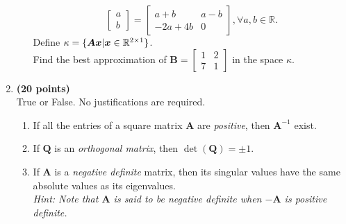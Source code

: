 \begin{enumerate}
\begin{enumerate}
\[\begin{bmatrix}
a\\b
\end{bmatrix}=\begin{bmatrix}
a+b&a-b\\-2a+4b&0
\end{bmatrix},\forall a,b\in\mathbb{R}.
\]
Define $\kappa=\{\bm{Ax}|\bm x\in\mathbb{R}^{2\times 1}\}$.\\
Find the best approximation of $\bm B=\begin{bmatrix}
1&2\\7&1
\end{bmatrix}$ in the space $\kappa$.\\
\end{enumerate}
\newpage
\item \textbf{(20 points)} \\
True or False. No justifications are required.
\begin{enumerate}
\item
If all the entries of a square matrix $\bm A$ are \textit{positive}, then $\bm A^{-1}$ exist.\\
\item
If $\bm Q$ is an \textit{orthogonal matrix}, then $\det(\bm Q)=\pm1$.\\
\item
If $\bm A$ is a \textit{negative definite} matrix, then its singular values have the same absolute values as its eigenvalues.\\
\textit{Hint: Note that $\bm A$ is said to be negative definite when $-\bm A$ is positive definite.}\\

\end{enumerate}
\end{enumerate}
